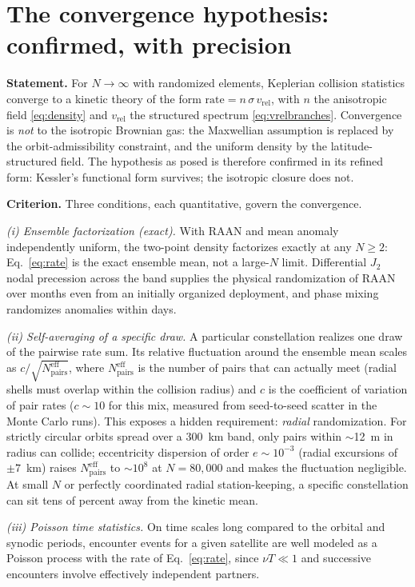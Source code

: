 \documentclass[11pt,a4paper]{article}
\newcommand{\vrel}{v_{\mathrm{rel}}}
\begin{document}
\section{The convergence hypothesis: confirmed, with precision}
\label{sec:convergence}

\textbf{Statement.} For $N \to \infty$ with randomized elements, Keplerian collision
statistics converge to a kinetic theory of the form
$\mathrm{rate} = n\,\sigma\,\vrel$, with $n$ the anisotropic field
\eqref{eq:density} and $\vrel$ the structured spectrum \eqref{eq:vrelbranches}.
Convergence is \emph{not} to the isotropic Brownian gas: the Maxwellian assumption is
replaced by the orbit-admissibility constraint, and the uniform density by the
latitude-structured field. The hypothesis as posed is therefore confirmed in its
refined form: Kessler's functional form survives; the isotropic closure does not.

\textbf{Criterion.} Three conditions, each quantitative, govern the convergence.

\emph{(i) Ensemble factorization (exact).} With RAAN and mean anomaly independently
uniform, the two-point density factorizes exactly at any $N \ge 2$:
Eq.~\eqref{eq:rate} is the exact ensemble mean, not a large-$N$ limit. Differential
$J_2$ nodal precession across the band supplies the physical randomization of RAAN
over months even from an initially organized deployment, and phase mixing randomizes
anomalies within days.

\emph{(ii) Self-averaging of a specific draw.} A particular constellation realizes one
draw of the pairwise rate sum. Its relative fluctuation around the ensemble mean
scales as $c/\sqrt{N_{\mathrm{pairs}}^{\mathrm{eff}}}$, where
$N_{\mathrm{pairs}}^{\mathrm{eff}}$ is the number of pairs that can actually meet
(radial shells must overlap within the collision radius) and $c$ is the coefficient
of variation of pair rates ($c \sim 10$ for this mix, measured from seed-to-seed
scatter in the Monte Carlo runs). This exposes a hidden requirement: \emph{radial}
randomization. For strictly circular orbits spread over a 300~km band, only pairs
within $\sim$12~m in radius can collide; eccentricity dispersion of order
$e \sim 10^{-3}$ (radial excursions of $\pm 7$~km) raises
$N_{\mathrm{pairs}}^{\mathrm{eff}}$ to $\sim 10^{8}$ at $N = 80{,}000$ and makes the
fluctuation negligible. At small $N$ or perfectly coordinated radial station-keeping,
a specific constellation can sit tens of percent away from the kinetic mean.

\emph{(iii) Poisson time statistics.} On time scales long compared to the orbital and
synodic periods, encounter events for a given satellite are well modeled as a Poisson
process with the rate of Eq.~\eqref{eq:rate}, since $\nu T \ll 1$ and successive
encounters involve effectively independent partners.
\end{document}
